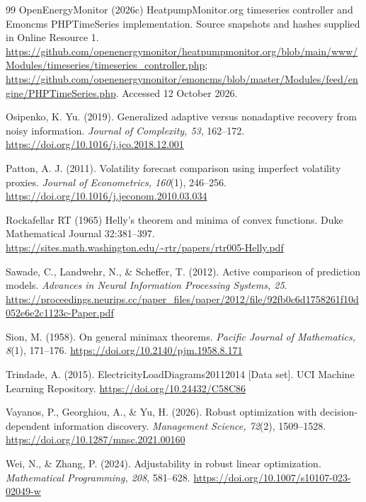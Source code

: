 \documentclass[12pt]{article}
\begin{document}
\begin{thebibliography}{99}
OpenEnergyMonitor (2026c) HeatpumpMonitor.org timeseries controller and
Emoncms PHPTimeSeries implementation. Source snapshots and hashes supplied
in Online Resource 1.
\url{https://github.com/openenergymonitor/heatpumpmonitor.org/blob/main/www/Modules/timeseries/timeseries_controller.php};
\url{https://github.com/openenergymonitor/emoncms/blob/master/Modules/feed/engine/PHPTimeSeries.php}.
Accessed 12 October 2026.

Osipenko, K. Yu. (2019). Generalized adaptive versus nonadaptive recovery
from noisy information. \emph{Journal of Complexity, 53}, 162--172.
\url{https://doi.org/10.1016/j.jco.2018.12.001}

Patton, A. J. (2011). Volatility forecast comparison using imperfect
volatility proxies. \emph{Journal of Econometrics, 160}(1), 246--256.
\url{https://doi.org/10.1016/j.jeconom.2010.03.034}

Rockafellar RT (1965) Helly's theorem and minima of convex functions.
Duke Mathematical Journal 32:381--397.
\url{https://sites.math.washington.edu/~rtr/papers/rtr005-Helly.pdf}

Sawade, C., Landwehr, N., \& Scheffer, T. (2012).
Active comparison of prediction models.
\emph{Advances in Neural Information Processing Systems, 25}.
\url{https://proceedings.neurips.cc/paper_files/paper/2012/file/92fb0c6d1758261f10d052e6e2c1123c-Paper.pdf}

Sion, M. (1958). On general minimax theorems.
\emph{Pacific Journal of Mathematics, 8}(1), 171--176.
\url{https://doi.org/10.2140/pjm.1958.8.171}

Trindade, A. (2015). ElectricityLoadDiagrams20112014 [Data set].
UCI Machine Learning Repository.
\url{https://doi.org/10.24432/C58C86}

Vayanos, P., Georghiou, A., \& Yu, H. (2026).
Robust optimization with decision-dependent information discovery.
\emph{Management Science, 72}(2), 1509--1528.
\url{https://doi.org/10.1287/mnsc.2021.00160}

Wei, N., \& Zhang, P. (2024). Adjustability in robust linear optimization.
\emph{Mathematical Programming, 208}, 581--628.
\url{https://doi.org/10.1007/s10107-023-02049-w}
\end{thebibliography}
\end{document}

